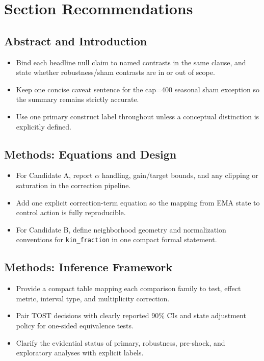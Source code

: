 \documentclass[11pt]{article}
\begin{document}
\section{Section Recommendations}

\subsection*{Abstract and Introduction}
\begin{itemize}
\item Bind each headline null claim to named contrasts in the same clause, and state whether robustness/sham contrasts are in or out of scope.
\item Keep one concise caveat sentence for the cap=400 seasonal sham exception so the summary remains strictly accurate.
\item Use one primary construct label throughout unless a conceptual distinction is explicitly defined.
\end{itemize}

\subsection*{Methods: Equations and Design}
\begin{itemize}
\item For Candidate A, report \(\alpha\) handling, gain/target bounds, and any clipping or saturation in the correction pipeline.
\item Add one explicit correction-term equation so the mapping from EMA state to control action is fully reproducible.
\item For Candidate B, define neighborhood geometry and normalization conventions for \texttt{kin\_fraction} in one compact formal statement.
\end{itemize}

\subsection*{Methods: Inference Framework}
\begin{itemize}
\item Provide a compact table mapping each comparison family to test, effect metric, interval type, and multiplicity correction.
\item Pair TOST decisions with clearly reported 90\% CIs and state adjustment policy for one-sided equivalence tests.
\item Clarify the evidential status of primary, robustness, pre-shock, and exploratory analyses with explicit labels.
\end{itemize}
\end{document}

